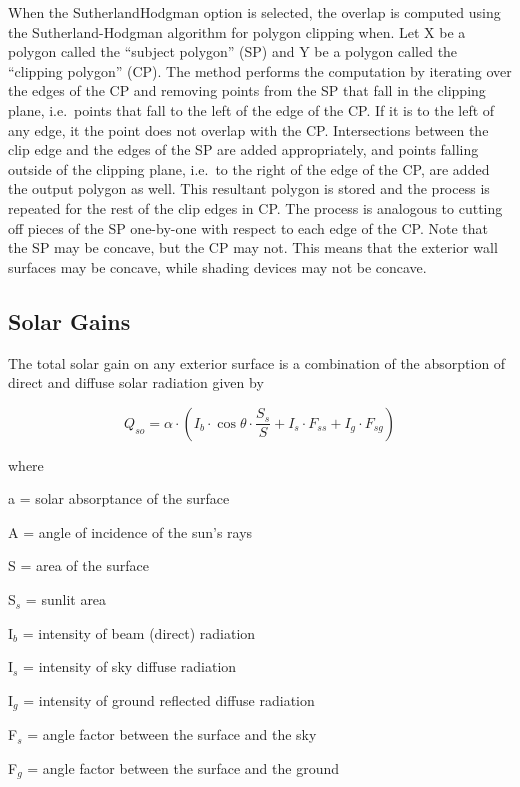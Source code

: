 When the SutherlandHodgman option is selected, the overlap is computed using the Sutherland-Hodgman algorithm for polygon clipping when. Let X be a polygon called the ``subject polygon'' (SP) and Y be a polygon called the ``clipping polygon'' (CP). The method performs the computation by iterating over the edges of the CP and removing points from the SP that fall in the clipping plane, i.e.~points that fall to the left of the edge of the CP. If it is to the left of any edge, it the point does not overlap with the CP. Intersections between the clip edge and the edges of the SP are added appropriately, and points falling outside of the clipping plane, i.e.~to the right of the edge of the CP, are added the output polygon as well. This resultant polygon is stored and the process is repeated for the rest of the clip edges in CP. The process is analogous to cutting off pieces of the SP one-by-one with respect to each edge of the CP. Note that the SP may be concave, but the CP may not. This means that the exterior wall surfaces may be concave, while shading devices may not be concave.

\subsection{Solar Gains}\label{solar-gains-000}

The total solar gain on any exterior surface is a combination of the absorption of direct and diffuse solar radiation given by

\begin{equation}
{Q_{so}} = \alpha \cdot \left( {{I_b}\cdot \cos \theta \cdot \frac{{{S_s}}}{S} + {I_s}\cdot {F_{ss}} + {I_g}\cdot {F_{sg}}} \right)
\end{equation}

where

a = solar absorptance of the surface

A = angle of incidence of the sun's rays

S = area of the surface

S\(_{s}\) = sunlit area

I\(_{b}\) = intensity of beam (direct) radiation

I\(_{s}\) = intensity of sky diffuse radiation

I\(_{g}\) = intensity of ground reflected diffuse radiation

F\(_{s}\) = angle factor between the surface and the sky

F\(_{g}\) = angle factor between the surface and the ground

